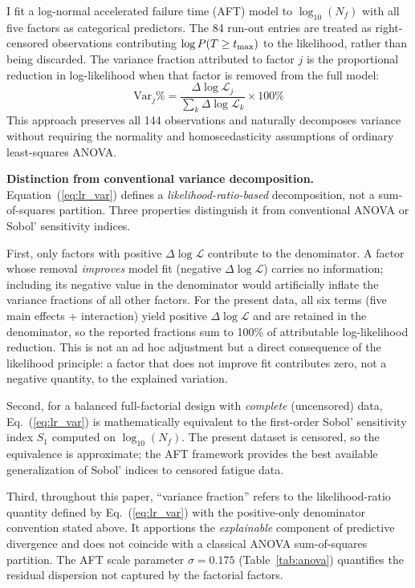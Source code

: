 \documentclass[twocolumn,12pt,a4paper]{article}
\begin{document}
I fit a log-normal accelerated failure time (AFT) model to
$\log_{10}(N_f)$ with all five factors as categorical predictors.
The 84 run-out entries are treated as right-censored observations
contributing $\log P(T \geq t_{\rm max})$ to the likelihood, rather
than being discarded. The variance fraction attributed to factor
$j$ is the proportional reduction in log-likelihood when that factor
is removed from the full model:
\begin{equation}
\text{Var}_j\% =
\frac{\Delta\log\mathcal{L}_j}{\sum_k \Delta\log\mathcal{L}_k}
\times 100\%
\label{eq:lr_var}
\end{equation}
This approach
preserves all 144 observations and naturally decomposes variance
without requiring the normality and homoscedasticity assumptions of
ordinary least-squares ANOVA.

\textbf{Distinction from conventional variance decomposition.}
Equation~(\ref{eq:lr_var}) defines a \emph{likelihood-ratio-based}
decomposition, not a sum-of-squares partition. Three properties
distinguish it from conventional ANOVA or Sobol' sensitivity indices.

First, only factors with positive $\Delta\log\mathcal{L}$ contribute
to the denominator. A factor whose removal \emph{improves} model fit
(negative $\Delta\log\mathcal{L}$) carries no information; including
its negative value in the denominator would artificially inflate the
variance fractions of all other factors. For the present data, all
six terms (five main effects + interaction) yield positive
$\Delta\log\mathcal{L}$ and are retained in the denominator, so the
reported fractions sum to 100\% of attributable log-likelihood
reduction. This is not an ad hoc adjustment but a direct consequence
of the likelihood principle: a factor that does not improve fit
contributes zero, not a negative quantity, to the explained
variation.

Second, for a balanced full-factorial design with \emph{complete}
(uncensored) data, Eq.~(\ref{eq:lr_var}) is mathematically equivalent
to the first-order Sobol' sensitivity index $S_1$ computed on
$\log_{10}(N_f)$. The present dataset is censored, so the equivalence
is approximate; the AFT framework provides the best available
generalization of Sobol' indices to censored fatigue data.

Third, throughout this paper, ``variance fraction'' refers to the
likelihood-ratio quantity defined by Eq.~(\ref{eq:lr_var}) with the
positive-only denominator convention stated above. It apportions the
\emph{explainable} component of predictive divergence and does not
coincide with a classical ANOVA sum-of-squares partition. The AFT
scale parameter $\sigma = 0.175$ (Table~\ref{tab:anova}) quantifies
the residual dispersion not captured by the factorial factors.
\end{document}
